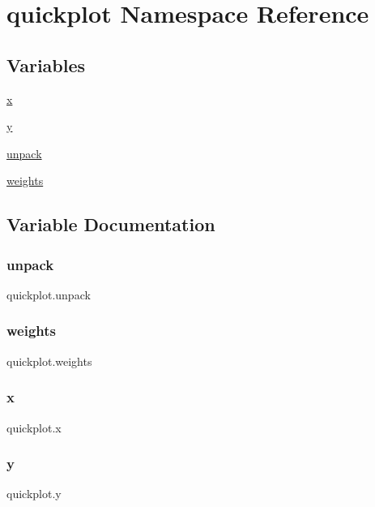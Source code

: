 \hypertarget{namespacequickplot}{}\section{quickplot Namespace Reference}
\label{namespacequickplot}
\subsection*{Variables}
\begin{DoxyCompactItemize}
\item 
\hyperlink{namespacequickplot_a81eab613e6132e2f34362e0d796374b6}{x}
\item 
\hyperlink{namespacequickplot_a010fcab3235443a7866d032bea36b2e8}{y}
\item 
\hyperlink{namespacequickplot_a26e9d46e54bdec05e3fe95d1105f5c63}{unpack}
\item 
\hyperlink{namespacequickplot_a665c218bc9c59ff692bf90bfbf077344}{weights}
\end{DoxyCompactItemize}


\subsection{Variable Documentation}
\mbox{\label{namespacequickplot_a26e9d46e54bdec05e3fe95d1105f5c63}} 
\subsubsection{\texorpdfstring{unpack}{unpack}}
{\footnotesize\ttfamily quickplot.\+unpack}

\mbox{\label{namespacequickplot_a665c218bc9c59ff692bf90bfbf077344}} 
\subsubsection{\texorpdfstring{weights}{weights}}
{\footnotesize\ttfamily quickplot.\+weights}

\mbox{\label{namespacequickplot_a81eab613e6132e2f34362e0d796374b6}} 
\subsubsection{\texorpdfstring{x}{x}}
{\footnotesize\ttfamily quickplot.\+x}

\mbox{\label{namespacequickplot_a010fcab3235443a7866d032bea36b2e8}} 
\subsubsection{\texorpdfstring{y}{y}}
{\footnotesize\ttfamily quickplot.\+y}


